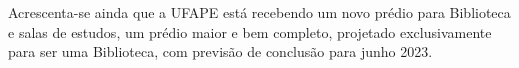\documentclass[
	12pt,				%
	openright,			%
  oneside,     %
	a4paper,			%
 hyphens,
	chapter=TITLE,		%
	english,			%
	french,				%
	spanish,			%
	brazil				%
	]{abntex2}
\begin{document}
Acrescenta-se ainda que a UFAPE está recebendo um novo prédio para Biblioteca e salas de estudos, um prédio maior e bem completo, projetado exclusivamente para ser uma Biblioteca, com previsão de conclusão para junho 2023.



\end{document}
